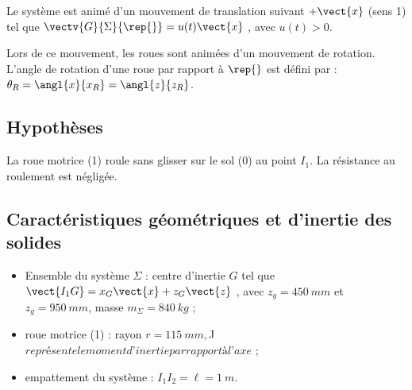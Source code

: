 Le système est animé d’un mouvement de translation
suivant $+\vect{x}$ (sens 1) tel que $\vectv{G}{\Sigma}{\rep{}} = u(t)\vect{x}$ , avec
$u(t) > 0$.

Lors de ce mouvement, les roues sont animées d’un
mouvement de rotation. L’angle de rotation d’une roue
par rapport à $\rep{}$ est défini par : $\theta_R =\angl{x}{x_R}=\angl{z}{z_R}$.



\subsection*{Hypothèses}
La roue motrice (1) roule sans glisser sur le sol (0) au point $I_1$.
La résistance au roulement est négligée.

\subsection*{Caractéristiques géométriques et d’inertie des solides}
\begin{itemize}
\item Ensemble du système $\Sigma$ : centre d’inertie $G$ tel que $\vect{I_1 G} = x_G\vect{x} + z_G\vect{z}$ , avec $z_g = \SI{450}{mm}$ et
$z_g = \SI{950}{mm}$, masse $m_{\Sigma} = \SI{840}{kg}$ ;
\item roue motrice (1) : rayon $r = \SI{115}{mm}, $J$ représente le moment d’inertie par rapport à l’axe
$ ;
\item empattement du système : $I_1I_2 =\ell = \SI{1}{m}$.
\end{itemize}
